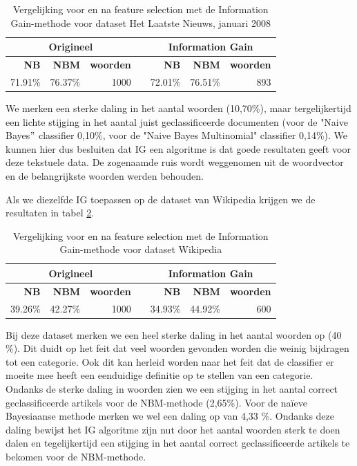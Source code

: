 \begin{table}[htbp]
	\centering
	\caption{Vergelijking voor en na feature selection met de Information Gain-methode voor dataset Het Laatste Nieuws, januari 2008}
	\begin{tabular}{rrrrrrr}
		\toprule
		\multicolumn{3}{c}{\textbf{Origineel}} & \multicolumn{1}{c|}{\textbf{}} & \multicolumn{3}{c}{\textbf{Information Gain}} \\
		\midrule
		\textbf{NB} & \textbf{NBM} & \textbf{woorden}    &   \multicolumn{1}{c|}{}   & \textbf{NB} & \textbf{NBM} & \textbf{woorden} \\
		71.91\% & 76.37\% & 1000  &   \multicolumn{1}{c|}{}    & 72.01\% & 76.51\% & 893 \\
		\bottomrule
	\end{tabular}%
	\label{tab:feature-selection}%
\end{table}%

We merken een sterke daling in het aantal woorden (10,70\%), maar tergelijkertijd een lichte stijging in het aantal juist geclassificeerde documenten (voor de "Naive Bayes$"$ classifier 0,10\%, voor de "Naive Bayes Multinomial" classifier 0,14\%).  We kunnen hier dus besluiten dat IG een algoritme is dat goede resultaten geeft voor deze tekstuele data. De zogenaamde ruis wordt weggenomen uit de woordvector en de belangrijkste woorden werden behouden.

Als we diezelfde IG toepassen op de dataset van Wikipedia krijgen we de resultaten in tabel \ref{tab:feature-selection-wiki}.

\begin{table}[htbp]
	\centering
	\caption{Vergelijking voor en na feature selection met de Information Gain-methode voor dataset Wikipedia}
	\begin{tabular}{rrrrrrr}
		\toprule
		\multicolumn{3}{c}{\textbf{Origineel}} & \multicolumn{1}{c|}{\textbf{}} & \multicolumn{3}{c}{\textbf{Information Gain}} \\
		\midrule
		\textbf{NB} & \textbf{NBM} & \textbf{woorden}    &   \multicolumn{1}{c|}{}   & \textbf{NB} & \textbf{NBM} & \textbf{woorden} \\
		39.26\% & 42.27\% & 1000  &   \multicolumn{1}{c|}{}    & 34.93\% & 44.92\% & 600 \\
		\bottomrule
	\end{tabular}%
	\label{tab:feature-selection-wiki}%
\end{table}%

Bij deze dataset merken we een heel sterke daling in het aantal woorden op (40 \%). Dit duidt op het feit dat veel woorden gevonden worden die weinig bijdragen tot een categorie. Ook dit kan herleid worden naar het feit dat de classifier er moeite mee heeft een eenduidige definitie op te stellen van een categorie. Ondanks de sterke daling in woorden zien we een stijging in het aantal correct geclassificeerde artikels voor de NBM-methode (2,65\%). Voor de na\"ieve Bayesiaanse methode merken we wel een daling op van 4,33 \%. Ondanks deze daling bewijst het IG algoritme zijn nut door het aantal woorden sterk te doen dalen en tegelijkertijd een stijging in het aantal correct geclassificeerde artikels te bekomen voor de NBM-methode.

